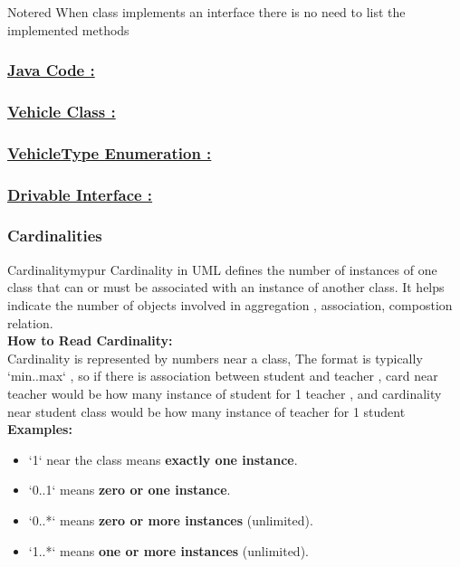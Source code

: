 \begin{prettyBox}{Note}{red}
When class implements an interface there is no need to list the implemented methods
\end{prettyBox}


\subsubsection*{\underline{Java Code :}}

\subsubsection*{\underline{Vehicle Class :}}


\newpage
\subsubsection*{\underline{VehicleType Enumeration :}}

\subsubsection*{\underline{Drivable Interface :}}



\subsubsection{Cardinalities}

\begin{prettyBox}{Cardinality}{mypur}
Cardinality in UML defines the number of instances of one class that can or must be associated with an instance of another class. It helps indicate the number of objects involved in aggregation , association, compostion relation.\\[0.25cm]
\textbf{How to Read Cardinality:}\\[0.15cm]
Cardinality is represented by numbers near a class, The format is typically `min..max` , so if there is association
between student and teacher , card near teacher would be how many instance of student for 1 teacher , and cardinality near
student class would be how many instance of teacher for 1 student\\[0.25cm]  
\textbf{Examples:}
\begin{itemize}
    \item `1` near the class means \textbf{exactly one instance}. 
    \item `0..1` means \textbf{zero or one instance}.
    \item `0..*` means \textbf{zero or more instances} (unlimited).
    \item `1..*` means \textbf{one or more instances} (unlimited).
\end{itemize}


\end{prettyBox}

